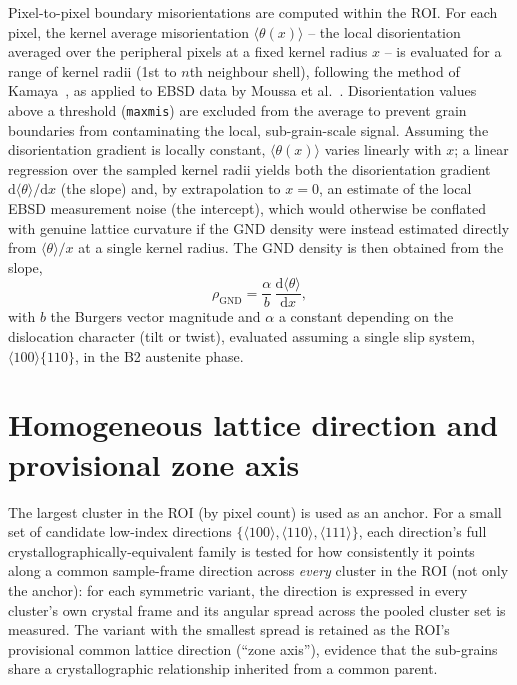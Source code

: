 \documentclass[11pt]{article}
\begin{document}
Pixel-to-pixel boundary misorientations are computed within the ROI. For
each pixel, the kernel average misorientation $\langle\theta(x)\rangle$ --
the local disorientation averaged over the peripheral pixels at a fixed
kernel radius $x$ -- is evaluated for a range of kernel radii (1st to
$n$th neighbour shell), following the method of
Kamaya~\cite{kamaya2011}, as applied to EBSD data by Moussa et
al.~\cite{moussa2017}. Disorientation values above a threshold
(\texttt{maxmis}) are excluded from the average to prevent grain
boundaries from contaminating the local, sub-grain-scale signal. Assuming
the disorientation gradient is locally constant, $\langle\theta(x)\rangle$
varies linearly with $x$; a linear regression over the sampled kernel
radii yields both the disorientation gradient $\mathrm{d}\langle
\theta\rangle/\mathrm{d}x$ (the slope) and, by extrapolation to $x=0$, an
estimate of the local EBSD measurement noise (the intercept), which would
otherwise be conflated with genuine lattice curvature if the GND density
were instead estimated directly from $\langle\theta\rangle/x$ at a single
kernel radius. The GND density is then obtained from the slope,
\begin{equation}
  \rho_{\mathrm{GND}} = \frac{\alpha}{b}\,\frac{\mathrm{d}\langle\theta\rangle}{\mathrm{d}x},
\end{equation}
with $b$ the Burgers vector magnitude and $\alpha$ a constant depending on
the dislocation character (tilt or twist), evaluated assuming a single
slip system, $\langle100\rangle\{110\}$, in the B2 austenite phase.

\section{Homogeneous lattice direction and provisional zone axis}

The largest cluster in the ROI (by pixel count) is used as an anchor. For a
small set of candidate low-index directions
$\{\langle100\rangle,\langle110\rangle,\langle111\rangle\}$, each
direction's full crystallographically-equivalent family is tested for how
consistently it points along a common sample-frame direction across
\emph{every} cluster in the ROI (not only the anchor): for each symmetric
variant, the direction is expressed in every cluster's own crystal frame
and its angular spread across the pooled cluster set is measured. The
variant with the smallest spread is retained as the ROI's provisional
common lattice direction (``zone axis''), evidence that the sub-grains
share a crystallographic relationship inherited from a common parent.
\end{document}
